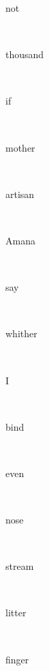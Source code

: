 \documentclass[a4paper]{article}
\begin{document}
\begin{multicols}{4}
\begin{multicols}{4}
\begin{multicols}{5}
{\hebrewfont{}} \begin{english}not\end{english}\\
{\hebrewfont{}} \begin{english}thousand\end{english}\\
{\hebrewfont{}} \begin{english}if\end{english}\\
{\hebrewfont{}} \begin{english}mother\end{english}\\
{\hebrewfont{}} \begin{english}artisan\end{english}\\
{\hebrewfont{}} \begin{english}Amana\end{english}\\
{\hebrewfont{}} \begin{english}say\end{english}\\
{\hebrewfont{}} \begin{english}whither\end{english}\\
{\hebrewfont{}} \begin{english}I\end{english}\\
{\hebrewfont{}} \begin{english}bind\end{english}\\
{\hebrewfont{}} \begin{english}even\end{english}\\
{\hebrewfont{}} \begin{english}nose\end{english}\\
{\hebrewfont{}} \begin{english}stream\end{english}\\
{\hebrewfont{}} \begin{english}litter\end{english}\\
{\hebrewfont{}} \begin{english}finger\end{english}\\

\end{multicols}
\end{multicols}
\end{multicols}
\end{document}
